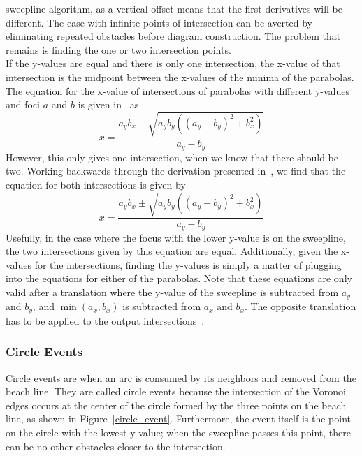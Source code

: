 \documentclass[conference]{IEEEtran}
\begin{document}
sweepline algorithm, as a vertical offset means that the first derivatives will
be different. The case with infinite points of intersection can be averted
by eliminating repeated obstacles before diagram construction. The problem
that remains is finding the one or two intersection points.\\
\indent If the y-values are equal and there is only one intersection, the x-value of that
intersection is the midpoint between the x-values of the minima of the parabolas.
The equation for the x-value of intersections of parabolas with different
y-values and foci $a$ and $b$ is given in~\cite{schaal} as
\begin{equation}
    x=\frac{a_{y}b_{x}-\sqrt{a_{y}b_{y}({(a_{y}-b_{y})}^{2}+b_{x}^{2})}}{a_{y}-b_{y}}
\end{equation}
However, this only gives one intersection, when we know that there should be two.
Working backwards through the derivation presented in~\cite{schaal}, we find that the
equation for both intersections is given by
\begin{equation}
    x=\frac{a_{y}b_{x}\pm\sqrt{a_{y}b_{y}({(a_{y}-b_{y})}^{2}+b_{x}^{2})}}{a_{y}-b_{y}}
\end{equation}
Usefully, in the case where the focus with the lower y-value is on the sweepline,
the two intersections given by this equation are equal. Additionally, given the
x-values for the intersections, finding the y-values is simply a matter of plugging
into the equations for either of the parabolas.
Note that these equations are only valid after a translation where the y-value of the
sweepline is subtracted from $a_{y}$ and $b_{y}$, and $\min(a_{x}, b_{x})$ is
subtracted from $a_{x}$ and $b_{x}$. The opposite translation has to be applied to the
output intersections~\cite{schaal}.

\subsubsection{Circle Events}
Circle events are when an arc is consumed by its neighbors and removed from the
beach line. They are called circle events because the intersection of the Voronoi
edges occurs at the center of the circle formed by the three points on the beach
line, as shown in Figure~\ref{circle_event}. Furthermore, the event itself is the
point on the circle with the lowest y-value; when the sweepline passes this point,
there can be no other obstacles closer to the intersection.\\
\end{document}
